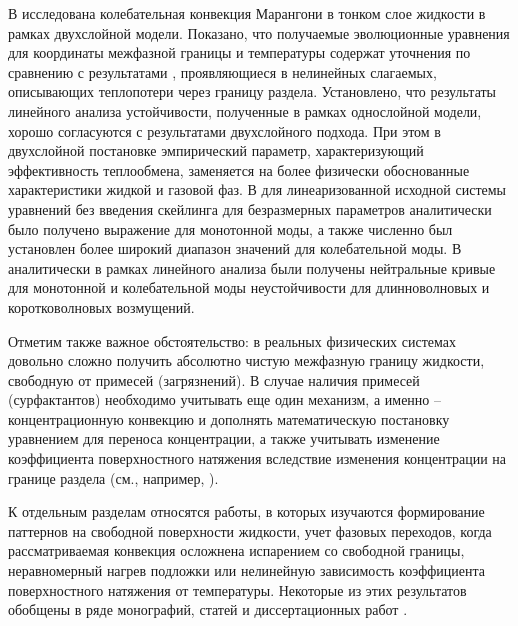 \documentclass[12pt,a4paper]{article}
\begin{document}
В \cite{Samoilova2015} исследована колебательная конвекция Марангони в тонком слое жидкости в рамках двухслойной модели. Показано, что получаемые эволюционные уравнения для координаты межфазной границы и температуры содержат уточнения по сравнению с результатами \cite{Shklyaev2010, Shklyaev2012}, проявляющиеся в нелинейных слагаемых, описывающих теплопотери через границу раздела. Установлено, что результаты линейного анализа устойчивости, полученные в рамках однослойной модели, хорошо согласуются с результатами двухслойного подхода. При этом в двухслойной постановке эмпирический параметр, характеризующий эффективность теплообмена, заменяется на более физически обоснованные характеристики жидкой и газовой фаз. В \cite{Samoilova2014} для линеаризованной исходной системы уравнений без введения скейлинга для безразмерных параметров аналитически было получено выражение для монотонной моды, а также численно был установлен более широкий диапазон значений для колебательной моды. В \cite{Sarma2018} аналитически в рамках линейного анализа были получены нейтральные кривые для монотонной и колебательной моды неустойчивости для длинноволновых и коротковолновых возмущений.  

Отметим также важное обстоятельство: в реальных физических системах довольно сложно получить абсолютно чистую межфазную границу жидкости, свободную от примесей (загрязнений). В случае наличия примесей (сурфактантов) необходимо учитывать еще один механизм, а именно -- концентрационную конвекцию и дополнять математическую постановку уравнением для переноса концентрации, а также учитывать изменение коэффициента поверхностного натяжения вследствие изменения концентрации на границе раздела (см., например, \cite{Mizev2014, Mikishev2015, Mikishev2019}).

К отдельным разделам относятся работы, в которых изучаются формирование паттернов на свободной поверхности жидкости, учет фазовых переходов, когда рассматриваемая конвекция осложнена испарением со свободной границы, неравномерный нагрев подложки или нелинейную зависимость коэффициента поверхностного натяжения от температуры. Некоторые из этих результатов обобщены в ряде монографий, статей и диссертационных работ \cite{Tan1990, Davis1987, Andreev2000, Schatz2001, Zuev2011monogr, Shklyaev2017, Lyulin2017, Nepomnyashchy2023}.  


\end{document}
